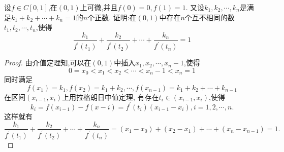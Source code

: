 \documentclass[lang=cn,newtx,10pt,scheme=chinese]{../Template/elegantbook}
\begin{document}
\begin{exercise}
设$f\in C[0,1]$,在$(0,1)$上可微,并且$f(0)=0,f(1)=1$.
又设$k_1,k_2,\cdots,k_n$是满足$k_1+k_2+\cdots+k_n=1$的$n$个正数.
证明:在$(0,1)$中存在$n$个互不相同的数$t_1,t_2,\cdots,t_n$,使得
\begin{equation}
    \frac{k_1}{f^{\prime}\left( t_1 \right)}+\frac{k_2}{f^{\prime}\left( t_2 \right)}+\cdots +\frac{k_n}{f^{\prime}\left( t_n \right)}=1
    \nonumber
\end{equation}

    \begin{proof}
        由介值定理知,可以在$(0,1)$中插入$x_1,x_2,\cdots,x_n-1$,使得
        \begin{equation}
            0=x_0<x_1<x_2<\cdots<x_n-1<x_n=1
            \nonumber
        \end{equation}
        同时满足
    \begin{equation}
        f(x_1)=k_1,f(x_2)=k_1+k_2,\cdots ,f(x_{n-1})=k_1+k_2+\cdots +k_{n-1}
        \nonumber
    \end{equation}
    在区间$(x_{i-1},x_i)$上用拉格朗日中值定理,
    有存在$t_i\in (x_{i-1},x_i)$,使得
    \begin{equation}
        k_i=f(x_{i-1})-f(x-i)=f^{\prime}(t_i)(x_{i-1}-x_i),i=1,2,\cdots,n.
    \nonumber
    \end{equation}
    这样就有
    \begin{equation}
        \frac{k_1}{f^{\prime}\left( t_1 \right)}+\frac{k_2}{f^{\prime}\left( t_2 \right)}+\cdots +\frac{k_n}{f^{\prime}\left( t_n \right)}=
        \left( x_1-x_0 \right) +\left( x_2-x_1 \right) +\cdots +\left( x_n-x_{n-1} \right) =1.
        \nonumber
    \end{equation}
    
\end{proof}

\end{exercise}
\end{document}
